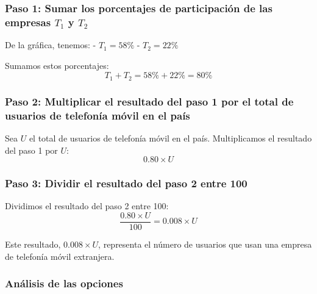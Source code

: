 \documentclass[
]{article}
\begin{document}
\subsubsection{\texorpdfstring{Paso 1: Sumar los porcentajes de
participación de las empresas \(T_1\) y
\(T_2\)}{Paso 1: Sumar los porcentajes de participación de las empresas T\_1 y T\_2}}\label{paso-1-sumar-los-porcentajes-de-participaciuxf3n-de-las-empresas-t_1-y-t_2}

De la gráfica, tenemos: - \(T_1 = 58\%\) - \(T_2 = 22\%\)

Sumamos estos porcentajes: \[ T_1 + T_2 = 58\% + 22\% = 80\% \]

\subsubsection{Paso 2: Multiplicar el resultado del paso 1 por el total
de usuarios de telefonía móvil en el
país}\label{paso-2-multiplicar-el-resultado-del-paso-1-por-el-total-de-usuarios-de-telefonuxeda-muxf3vil-en-el-pauxeds}

Sea \(U\) el total de usuarios de telefonía móvil en el país.
Multiplicamos el resultado del paso 1 por \(U\): \[ 0.80 \times U \]

\subsubsection{Paso 3: Dividir el resultado del paso 2 entre
100}\label{paso-3-dividir-el-resultado-del-paso-2-entre-100}

Dividimos el resultado del paso 2 entre 100:
\[ \frac{0.80 \times U}{100} = 0.008 \times U \]

Este resultado, \(0.008 \times U\), representa el número de usuarios que
usan una empresa de telefonía móvil extranjera.

\subsubsection{Análisis de las
opciones}\label{anuxe1lisis-de-las-opciones}
\end{document}
